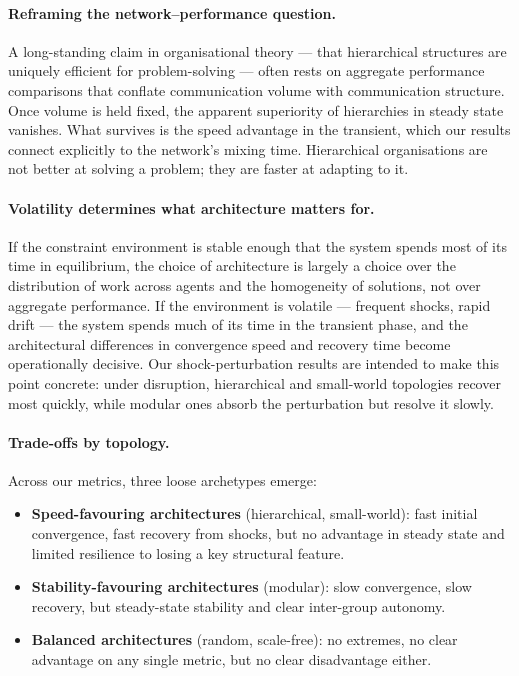 \documentclass{article}
\begin{document}
\paragraph{Reframing the network--performance question.} A long-standing claim in organisational theory --- that hierarchical structures are uniquely efficient for problem-solving \parencite{simon1962architecture, bolton1994firm} --- often rests on aggregate performance comparisons that conflate communication volume with communication structure. Once volume is held fixed, the apparent superiority of hierarchies in steady state vanishes. What survives is the speed advantage in the transient, which our results connect explicitly to the network's mixing time. Hierarchical organisations are not better at solving a problem; they are faster at adapting to it.

\paragraph{Volatility determines what architecture matters for.} If the constraint environment is stable enough that the system spends most of its time in equilibrium, the choice of architecture is largely a choice over the distribution of work across agents and the homogeneity of solutions, not over aggregate performance. If the environment is volatile --- frequent shocks, rapid drift --- the system spends much of its time in the transient phase, and the architectural differences in convergence speed and recovery time become operationally decisive. Our shock-perturbation results are intended to make this point concrete: under disruption, hierarchical and small-world topologies recover most quickly, while modular ones absorb the perturbation but resolve it slowly.

\paragraph{Trade-offs by topology.} Across our metrics, three loose archetypes emerge:
\begin{itemize}
    \item \textbf{Speed-favouring architectures} (hierarchical, small-world): fast initial convergence, fast recovery from shocks, but no advantage in steady state and limited resilience to losing a key structural feature.
    \item \textbf{Stability-favouring architectures} (modular): slow convergence, slow recovery, but steady-state stability and clear inter-group autonomy.
    \item \textbf{Balanced architectures} (random, scale-free): no extremes, no clear advantage on any single metric, but no clear disadvantage either.
\end{itemize}
\end{document}
